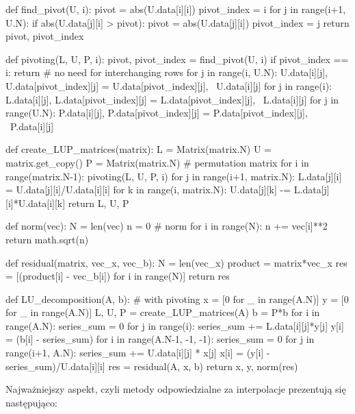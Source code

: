 \documentclass{article}
\begin{document}
\begin{python}
def find_pivot(U, i):
    pivot = abs(U.data[i][i])
    pivot_index = i
    for j in range(i+1, U.N):
        if abs(U.data[j][i] > pivot):
            pivot = abs(U.data[j][i])
            pivot_index = j
    return pivot, pivot_index


def pivoting(L, U, P, i):
    pivot, pivot_index = find_pivot(U, i)
    if pivot_index == i:
        return  # no need for interchanging rows
    for j in range(i, U.N):
        U.data[i][j], U.data[pivot_index][j] = U.data[pivot_index][j], \
        U.data[i][j]
    for j in range(i):
        L.data[i][j], L.data[pivot_index][j] = L.data[pivot_index][j], \
        L.data[i][j]
    for j in range(U.N):
        P.data[i][j], P.data[pivot_index][j] = P.data[pivot_index][j], \
        P.data[i][j]


def create_LUP_matrices(matrix):
    L = Matrix(matrix.N)
    U = matrix.get_copy()
    P = Matrix(matrix.N)  # permutation matrix
    for i in range(matrix.N-1):
        pivoting(L, U, P, i)
        for j in range(i+1, matrix.N):
            L.data[j][i] = U.data[j][i]/U.data[i][i]
            for k in range(i, matrix.N):
                U.data[j][k] -= L.data[j][i]*U.data[i][k]
    return L, U, P


def norm(vec):
    N = len(vec)
    n = 0  # norm
    for i in range(N):
        n += vec[i]**2
    return math.sqrt(n)


def residual(matrix, vec_x, vec_b):
    N = len(vec_x)
    product = matrix*vec_x
    res = [(product[i] - vec_b[i]) for i in range(N)]
    return res


def LU_decomposition(A, b):  # with pivoting
    x = [0 for _ in range(A.N)]
    y = [0 for _ in range(A.N)]
    L, U, P = create_LUP_matrices(A)
    b = P*b
    for i in range(A.N):
        series_sum = 0
        for j in range(i):
            series_sum += L.data[i][j]*y[j]
        y[i] = (b[i] - series_sum)
    for i in range(A.N-1, -1, -1):
        series_sum = 0
        for j in range(i+1, A.N):
            series_sum += U.data[i][j] * x[j]
        x[i] = (y[i] - series_sum)/U.data[i][i]
    res = residual(A, x, b)
    return x, y, norm(res)
\end{python}

\newpage
Najważniejszy aspekt, czyli metody odpowiedzialne za interpolacje prezentują się następująco:
\end{document}
